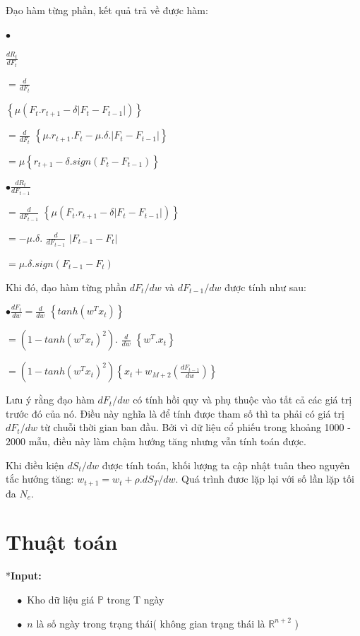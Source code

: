 \documentclass[14pt]{extreport}
\begin{document}
Đạo hàm từng phần, kết quả trả về được hàm:

$\bullet$ {\Large $\frac{dR_t}{dF_t}$ 

 $=\frac{d}{dF_t} $ } $\left \{ \mu\left ( F_{t}.r_{t+1}-\delta\left | F_t-F_{t-1} \right | \right ) \right \}$


{\Large $=\frac{d}{dF_t}$ } $\left \{ \mu.r_{t+1}.F_t -\mu.\delta.\left | F_t-F_{t-1} \right | \right \}$


$= \mu \left \{ r_{t+1} - \delta.sign\left ( F_t-F_{t-1} \right ) \right \}$

{\Large $\bullet \frac{dR_t}{dF_{t-1}}$} 

{\Large$=\frac{d}{dF_{t-1}}$ }$\left \{ \mu\left ( F_{t}.r_{t+1}-\delta\left | F_t-F_{t-1} \right | \right ) \right \}$
 
 $=-\mu.\delta.$ {\Large $\frac{d}{dF_{t-1}}$} $\left|F_{t-1}-F_t \right|$
 
 $=\mu.\delta.sign\left(F_{t-1}-F_t \right)$


Khi đó, đạo hàm từng phần $dF_t/dw$ và $dF_{t-1}/dw$ được tính như sau:

{\Large $\bullet\frac{dF_t}{d w} = \frac{d}{d w}$ }$\left \{ tanh(w^Tx_t) \right \}$

$=\left ( 1-tanh\left ( w^Tx_t \right )^2 \right ).$ {\Large$\frac{d}{d w}$ } $\left \{ w^T.x_t \right \}$

$=\left ( 1-tanh\left ( w^Tx_t \right )^2 \right )\left \{ x_t+w_{M+2} \left(\frac{d F_{t-1}}{d w}\right)\right \}$

Lưu ý rằng đạo hàm $d F_t/d w$ có tính hồi quy và phụ thuộc vào tất cả các giá trị trước đó của nó. Điều này nghĩa là để tính được tham số thì ta phải có giá trị $d F_t/d w$ từ chuỗi thời gian ban đầu. Bởi vì dữ liệu cổ phiếu trong khoảng 1000 - 2000 mẫu, điều này làm chậm hướng tăng nhưng vẫn tính toán được.

Khi điều kiện $d S_t/d w$ được tính toán, khối lượng ta cập nhật tuân theo nguyên tắc hướng tăng: $w_{t+1}=w_t+\rho.d S_T/d w$. Quá trình đươc lặp lại với số lần lặp tối đa $N_e$.

\section{Thuật toán}

\hspace{1cm}*\textbf{Input: }

$\quad \bullet$ Kho dữ liệu giá $\mathbb{P}$ trong T ngày

$\quad \bullet $ $n$ là số ngày trong trạng thái( không gian trạng thái là $\mathbb{R}^{n+2}$ )
\end{document}
